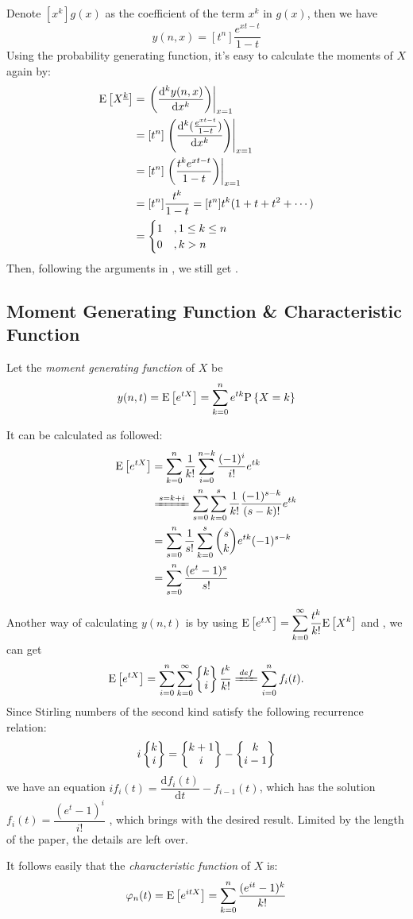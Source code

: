 Denote $ [x^k]g(x)$ as the coefficient of the term $ x^k$ in $ g(x)$, then we have
\[ y(n,x) = [t^n]\dfrac{e^{xt-t}}{1-t}\]
Using the probability generating function, it's easy to calculate the moments of $ X$ again by:
\begin{align*}
  \text{E}\left[X^{\underline{k}}\right] &= \left. \left( \dfrac{\mathrm{d}^k y(n,x)}{\mathrm{d}x^k}\right) \right|_{x=1} \\
  & = [t^n]\left. \left( \dfrac{\mathrm{d}^k(\frac{e^{xt-t}}{1-t})}{\mathrm{d}x^k}\right)\right|_{x=1}\\
  &=[t^n]\left. \left( \dfrac{t^ke^{xt-t}}{1-t}\right)\right|_{x=1}\\
  &=[t^n]\dfrac{t^k}{1-t} = [t^n]t^k(1+t+t^2+\cdots )\\
  &=\begin{cases}1 \quad ,1\le k \le n \\ 0 \quad , k > n\end{cases}
\end{align*}
Then, following the arguments in ,
we still get .

\subsection{Moment Generating Function \& Characteristic Function}
Let the \emph{moment generating function} of $ X$ be
\[ y(n, t) = \E{e^{tX}} = \sum_{k=0}^{n}e^{tk}\Pr{X=k} \]

It can be calculated as followed:
\begin{align*}
  \E{e^{tX}} &=\sum_{k=0}^n\dfrac{1}{k!}\sum_{i=0}^{n-k}\dfrac{(-1)^i}{i!}e^{tk} \\
  &\xlongequal{s=k+i}\sum_{s=0}^n\sum_{k=0}^s\dfrac{1}{k!}\dfrac{(-1)^{s-k}}{(s-k)!}e^{tk} \\
  &=\sum_{s=0}^n\dfrac{1}{s!}\sum_{k=0}^{s}{s\choose k}e^{tk}(-1)^{s-k} \\
  &=\sum_{s=0}^n\dfrac{(e^t-1)^s}{s!}
\end{align*}

Another way of calculating $y(n,t)$ is by using
$ \E{e^{tX}} = \sum_{k=0}^{\infty}\dfrac{t^k}{k!}\E{X^k}$ and , we can get
\[ \E{e^{tX}} = \sum_{i=0}^n\sum_{k=0}^{\infty}\Stir{k}{i}\dfrac{t^k}{k!} \xlongequal{def}\sum_{i=0}^nf_i(t).\]
Since Stirling numbers of the second kind satisfy the following recurrence relation:
\[ i\left\{\begin{matrix}k\\i\end{matrix}\right\} = \left\{\begin{matrix}k+1\\i\end{matrix}\right\}-\left\{\begin{matrix}k\\i-1\end{matrix}\right\}\]
we have an equation $ if_i(t) = \dfrac{\mathrm{d}f_i(t)}{\mathrm{d}t}-f_{i-1}(t)$, which has the solution
$ f_i(t) = \dfrac{(e^t-1)^i}{i!}$ , which brings with the desired result.
Limited by the length of the paper, the details are left over.

It follows easily that the \emph{characteristic function} of $ X$ is:
\[ \varphi_n(t)=\E{e^{itX}}  =\sum_{k=0}^n\dfrac{(e^{it}-1)^k}{k!}\]
